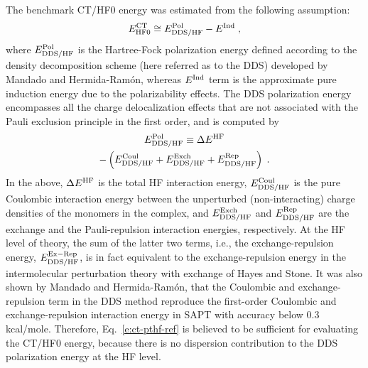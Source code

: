 \documentclass[aip,jcp,amsmath,amssymb,reprint,floatfix]{revtex4-1}
\begin{document}
The benchmark CT/HF0 energy was estimated
from the following assumption:
%
\begin{equation}\label{e:ct-pthf-ref}
 E^{\rm CT}_{\rm HF0} \cong  E^{\rm Pol}_{\rm DDS/HF} 
 -  E^{\rm Ind} \;,
\end{equation}
%
where $E^{\rm Pol}_{\rm DDS/HF}$ is the Hartree\hyp{}Fock polarization energy
defined
according to the density decomposition scheme (here referred as to the DDS) 
developed by Mandado and Hermida\hyp{}Ram{\'o}n,\cite{Mandado.Hermida-Ramon.JCTC.2011} 
whereas $E^{\rm Ind}$ term is the 
approximate pure induction energy due to the polarizability effects.\cite{Stone.TheTheoryOfIntermolecularForces.1996}
The DDS polarization energy encompasses all the charge delocalization
effects that are not associated with the Pauli exclusion principle
in the first order, and is computed by
%
\begin{multline}\label{e:de-pol-dds}
 E^{\rm Pol}_{\rm DDS/HF} \equiv \Delta E^{\rm HF} \\
 - \left(
   E^{\rm Coul}_{\rm DDS/HF}
 + E^{\rm Exch}_{\rm DDS/HF}
 + E^{\rm Rep}_{\rm DDS/HF} 
   \right)\;.
\end{multline}
%
In the above, $\Delta E^{\rm HF}$ is the total HF interaction
energy,
$E^{\rm Coul}_{\rm DDS/HF}$ is the pure Coulombic interaction energy
between the unperturbed (non\hyp{}interacting) charge densities of the monomers in the complex,
and
$E^{\rm Exch}_{\rm DDS/HF}$ and $E^{\rm Rep}_{\rm DDS/HF}$
are the exchange and the Pauli\hyp{}repulsion interaction energies, respectively.
At the HF level of theory, the sum of the latter two terms,
i.e., the exchange\hyp{}repulsion energy, $E^{\rm Ex-Rep}_{\rm DDS/HF}$,
is in fact
equivalent to the exchange\hyp{}repulsion energy 
in the intermolecular perturbation theory with exchange of Hayes and Stone.\cite{Hayes.Stone.MolPhys.1984} 
It was also shown by 
Mandado and Hermida\hyp{}Ram{\'o}n,\cite{Mandado.Hermida-Ramon.JCTC.2011}
that the Coulombic and exchange\hyp{}repulsion term
in the DDS method reproduce the first\hyp{}order Coulombic and exchange\hyp{}repulsion
interaction energy in SAPT\cite{Jeziorski.Moszynski.Szalewicz.ChemRev.1994}
with accuracy below 0.3 kcal/mole.
Therefore, Eq.~\eqref{e:ct-pthf-ref} is believed to be sufficient
for evaluating the CT/HF0 energy, because there is no dispersion
contribution to the DDS polarization energy at the HF level.
\end{document}
